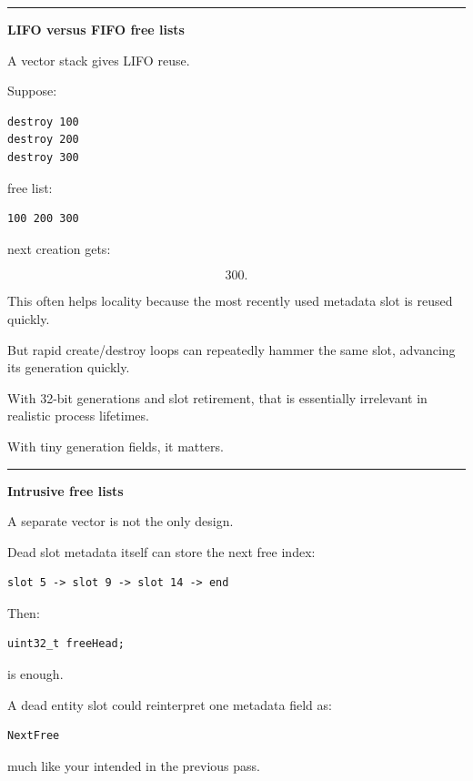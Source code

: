 \begin{center}\rule{0.5\linewidth}{0.5pt}\end{center}

\textbf{LIFO versus FIFO free lists}

A vector stack gives LIFO reuse.

Suppose:

\begin{verbatim}
destroy 100
destroy 200
destroy 300
\end{verbatim}

free list:

\begin{verbatim}
100 200 300
\end{verbatim}

next creation gets:

\[
300.
\]

This often helps locality because the most recently used metadata slot is reused quickly.

But rapid create/destroy loops can repeatedly hammer the same slot, advancing its generation quickly.

With 32-bit generations and slot retirement, that is essentially irrelevant in realistic process lifetimes.

With tiny generation fields, it matters.

\begin{center}\rule{0.5\linewidth}{0.5pt}\end{center}

\textbf{Intrusive free lists}

A separate vector is not the only design.

Dead slot metadata itself can store the next free index:

\begin{verbatim}
slot 5 -> slot 9 -> slot 14 -> end
\end{verbatim}

Then:

\begin{verbatim}
uint32_t freeHead;
\end{verbatim}

is enough.

A dead entity slot could reinterpret one metadata field as:

\begin{verbatim}
NextFree
\end{verbatim}

much like your  intended in the previous pass.

